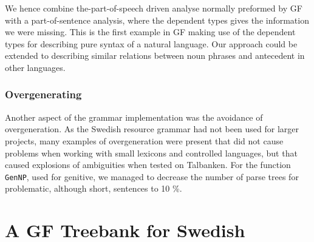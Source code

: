 \documentclass[runningheads,a4paper]{llncs}
\begin{document}
We hence combine the-part-of-speech driven analyse normally preformed by
GF with a part-of-sentence analysis, where the dependent types gives the 
information we were missing.
This is the first example in GF making use of the dependent types for 
describing pure syntax of a natural language. Our approach could be extended
to describing similar relations between 
noun phrases and antecedent in other languages.

\subsubsection{Overgenerating}
Another aspect of the grammar implementation was the avoidance of overgeneration. As
the Swedish resource grammar had not been used for larger projects, many examples of
overgeneration were present that did not cause problems when working with small
lexicons and controlled languages, but that caused explosions of ambiguities when 
tested on Talbanken. For the function \verb-GenNP-, used for genitive, we managed
to decrease the number of parse trees for problematic, although short, sentences to 10 \%.


\section{A GF Treebank for Swedish}
\label{sec:mapping}

\end{document}

